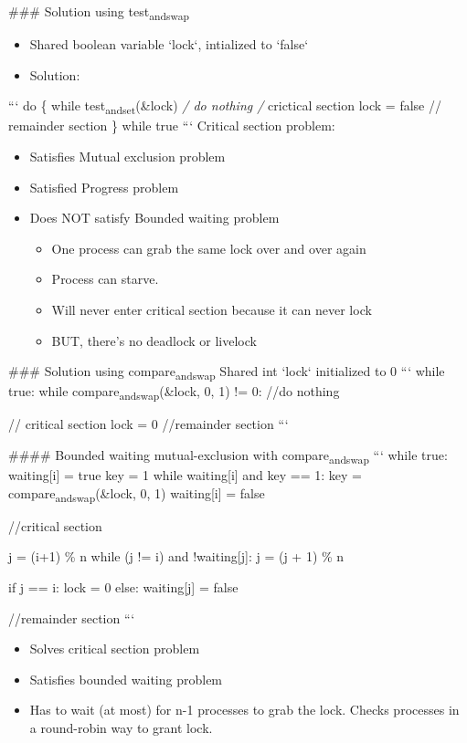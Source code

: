 \documentclass[11pt]{article}
\begin{document}
\#\#\# Solution using test\textsubscript{and}\textsubscript{swap}
\begin{itemize}
\item Shared boolean variable `lock`, intialized to `false`
\item Solution:
\end{itemize}
```
do \{
  while test\textsubscript{and}\textsubscript{set}(\&lock)
    \emph{/ do nothing
      /} crictical section
    lock = false
      // remainder section
\} while true
```
Critical section problem:
\begin{itemize}
\item Satisfies Mutual exclusion problem
\item Satisfied Progress problem
\item Does NOT satisfy Bounded waiting problem
\begin{itemize}
\item One process can grab the same lock over and over again
\item Process can starve.
\item Will never enter critical section because it can never lock
\item BUT, there's no deadlock or livelock
\end{itemize}
\end{itemize}

\#\#\# Solution using compare\textsubscript{and}\textsubscript{swap}
Shared int `lock` initialized to 0
```
while true:
  while compare\textsubscript{and}\textsubscript{swap}(\&lock, 0, 1) != 0:
    //do nothing

  // critical section
  lock = 0
  //remainder section
```

\#\#\#\# Bounded waiting mutual-exclusion with compare\textsubscript{and}\textsubscript{swap}
```
while true:
  waiting[i] = true
  key = 1
  while waiting[i] and key == 1:
    key = compare\textsubscript{and}\textsubscript{swap}(\&lock, 0, 1)
  waiting[i] = false

//critical section

j = (i+1) \% n
while (j != i) and !waiting[j]:
  j = (j + 1) \% n

if j == i:
  lock = 0
else:
  waiting[j] = false

  //remainder section
```
\begin{itemize}
\item Solves critical section problem
\item Satisfies bounded waiting problem
\item Has to wait (at most) for n-1 processes to grab the lock. Checks processes in a round-robin way to grant lock.
\end{itemize}
\end{document}
